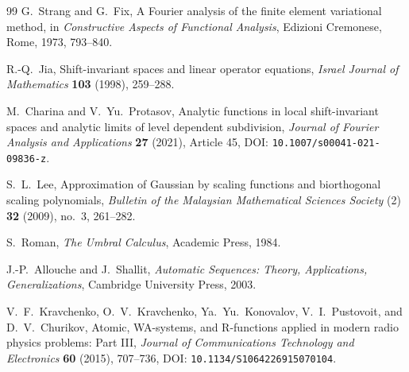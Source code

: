 \documentclass[11pt,oneside]{article}
\theoremstyle{definition}
\theoremstyle{remark}
\begin{document}
\begin{thebibliography}{99}
G.~Strang and G.~Fix,
\newblock A Fourier analysis of the finite element variational method,
\newblock in \emph{Constructive Aspects of Functional Analysis}, Edizioni Cremonese, Rome, 1973, 793--840.

R.-Q.~Jia,
\newblock Shift-invariant spaces and linear operator equations,
\newblock \emph{Israel Journal of Mathematics} \textbf{103} (1998), 259--288.

M.~Charina and V.~Yu.~Protasov,
\newblock Analytic functions in local shift-invariant spaces and analytic limits of level dependent subdivision,
\newblock \emph{Journal of Fourier Analysis and Applications} \textbf{27} (2021), Article 45, DOI: \nolinkurl{10.1007/s00041-021-09836-z}.

S.~L.~Lee,
\newblock Approximation of Gaussian by scaling functions and biorthogonal scaling polynomials,
\newblock \emph{Bulletin of the Malaysian Mathematical Sciences Society} (2) \textbf{32} (2009), no.~3, 261--282.

S.~Roman,
\newblock \emph{The Umbral Calculus},
\newblock Academic Press, 1984.

J.-P.~Allouche and J.~Shallit,
\newblock \emph{Automatic Sequences: Theory, Applications, Generalizations},
\newblock Cambridge University Press, 2003.

V.~F.~Kravchenko, O.~V.~Kravchenko, Ya.~Yu.~Konovalov, V.~I.~Pustovoit, and D.~V.~Churikov,
\newblock Atomic, WA-systems, and R-functions applied in modern radio physics problems: Part III,
\newblock \emph{Journal of Communications Technology and Electronics} \textbf{60} (2015), 707--736,
DOI: \nolinkurl{10.1134/S1064226915070104}.

\end{thebibliography}
\end{document}
